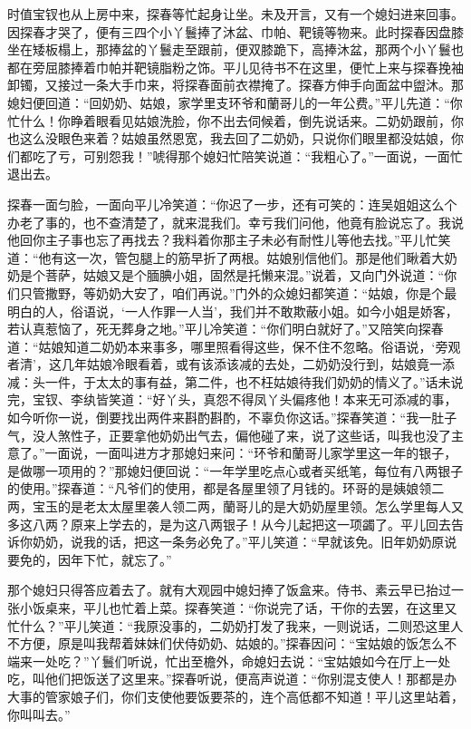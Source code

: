\documentclass[12pt,oneside]{book}
\begin{document}
时值宝钗也从上房中来，探春等忙起身让坐。未及开言，又有一个媳妇进来回事。因探春才哭了，便有三四个小丫鬟捧了沐盆、巾帕、靶镜等物来。此时探春因盘膝坐在矮板榻上，那捧盆的丫鬟走至跟前，便双膝跪下，高捧沐盆，那两个小丫鬟也都在旁屈膝捧着巾帕并靶镜脂粉之饰。平儿见待书不在这里，便忙上来与探春挽袖卸镯，又接过一条大手巾来，将探春面前衣襟掩了。探春方伸手向面盆中盥沐。那媳妇便回道：“回奶奶、姑娘，家学里支环爷和蘭哥儿的一年公费。”平儿先道：“你忙什么！你睁着眼看见姑娘洗脸，你不出去伺候着，倒先说话来。二奶奶跟前，你也这么没眼色来着？姑娘虽然恩宽，我去回了二奶奶，只说你们眼里都没姑娘，你们都吃了亏，可别怨我！”唬得那个媳妇忙陪笑说道：“我粗心了。”一面说，一面忙退出去。

探春一面匀脸，一面向平儿冷笑道：“你迟了一步，还有可笑的：连吴姐姐这么个办老了事的，也不查清楚了，就来混我们。幸亏我们问他，他竟有脸说忘了。我说他回你主子事也忘了再找去？我料着你那主子未必有耐性儿等他去找。”平儿忙笑道：“他有这一次，管包腿上的筋早折了两根。姑娘别信他们。那是他们瞅着大奶奶是个菩萨，姑娘又是个腼腆小姐，固然是托懒来混。”说着，又向门外说道：“你们只管撒野，等奶奶大安了，咱们再说。”门外的众媳妇都笑道：“姑娘，你是个最明白的人，俗语说，‘一人作罪一人当’，我们并不敢欺蔽小姐。如今小姐是娇客，若认真惹恼了，死无葬身之地。”平儿冷笑道：“你们明白就好了。”又陪笑向探春道：“姑娘知道二奶奶本来事多，哪里照看得这些，保不住不忽略。俗语说，‘旁观者清’，这几年姑娘冷眼看着，或有该添该减的去处，二奶奶没行到，姑娘竟一添减：头一件，于太太的事有益，第二件，也不枉姑娘待我们奶奶的情义了。”话未说完，宝钗、李纨皆笑道：“好丫头，真怨不得凤丫头偏疼他！本来无可添减的事，如今听你一说，倒要找出两件来斟酌斟酌，不辜负你这话。”探春笑道：“我一肚子气，没人煞性子，正要拿他奶奶出气去，偏他碰了来，说了这些话，叫我也没了主意了。”一面说，一面叫进方才那媳妇来问：“环爷和蘭哥儿家学里这一年的银子，是做哪一项用的？”那媳妇便回说：“一年学里吃点心或者买纸笔，每位有八两银子的使用。”探春道：“凡爷们的使用，都是各屋里领了月钱的。环哥的是姨娘领二两，宝玉的是老太太屋里袭人领二两，蘭哥儿的是大奶奶屋里领。怎么学里每人又多这八两？原来上学去的，是为这八两银子！从今儿起把这一项蠲了。平儿回去告诉你奶奶，说我的话，把这一条务必免了。”平儿笑道：“早就该免。旧年奶奶原说要免的，因年下忙，就忘了。”

那个媳妇只得答应着去了。就有大观园中媳妇捧了饭盒来。侍书、素云早已抬过一张小饭桌来，平儿也忙着上菜。探春笑道：“你说完了话，干你的去罢，在这里又忙什么？”平儿笑道：“我原没事的，二奶奶打发了我来，一则说话，二则恐这里人不方便，原是叫我帮着妹妹们伏侍奶奶、姑娘的。”探春因问：“宝姑娘的饭怎么不端来一处吃？”丫鬟们听说，忙出至檐外，命媳妇去说：“宝姑娘如今在厅上一处吃，叫他们把饭送了这里来。”探春听说，便高声说道：“你别混支使人！那都是办大事的管家娘子们，你们支使他要饭要茶的，连个高低都不知道！平儿这里站着，你叫叫去。”
\end{document}
